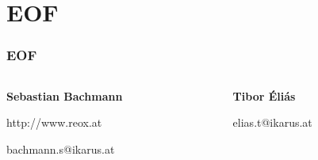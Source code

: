 \documentclass[12pt,a4paper]{beamer}
\begin{document}
\section{EOF}
\begin{frame}
\frametitle{EOF}
  \begin{columns}
    \begin{column}{.5\linewidth}
    \centering
	\textbf{Sebastian Bachmann}
	
	\vspace{2em}
	
	http://www.reox.at

	\vspace{2em}	
	
	bachmann.s@ikarus.at
    \end{column}
    \begin{column}{.5\linewidth}
    \centering
	\textbf{Tibor Éliás}
	
	\vspace{2em}
	
	\qquad

	\vspace{2em}	
	
	elias.t@ikarus.at
    \end{column}
  \end{columns}
\end{frame}
\end{document}
